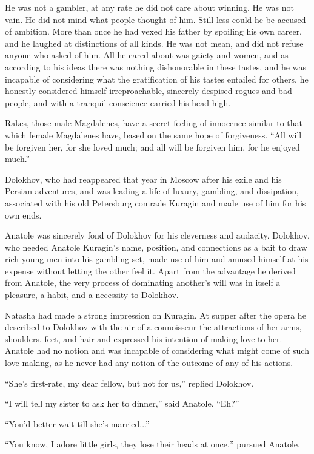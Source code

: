 He was not a gambler, at any rate he did not care about
winning. He was not vain. He did not mind what people thought of
him. Still less could he be accused of ambition. More than once
he had vexed his father by spoiling his own career, and he
laughed at distinctions of all kinds. He was not mean, and did
not refuse anyone who asked of him. All he cared about was gaiety
and women, and as according to his ideas there was nothing
dishonorable in these tastes, and he was incapable of considering
what the gratification of his tastes entailed for others, he
honestly considered himself irreproachable, sincerely despised
rogues and bad people, and with a tranquil conscience carried his
head high.

Rakes, those male Magdalenes, have a secret feeling of innocence
similar to that which female Magdalenes have, based on the same
hope of forgiveness. ``All will be forgiven her, for she loved
much; and all will be forgiven him, for he enjoyed much.''

Dolokhov, who had reappeared that year in Moscow after his exile
and his Persian adventures, and was leading a life of luxury,
gambling, and dissipation, associated with his old Petersburg
comrade Kuragin and made use of him for his own ends.

Anatole was sincerely fond of Dolokhov for his cleverness and
audacity.  Dolokhov, who needed Anatole Kuragin's name, position,
and connections as a bait to draw rich young men into his
gambling set, made use of him and amused himself at his expense
without letting the other feel it.  Apart from the advantage he
derived from Anatole, the very process of dominating another's
will was in itself a pleasure, a habit, and a necessity to
Dolokhov.

Natasha had made a strong impression on Kuragin. At supper after
the opera he described to Dolokhov with the air of a connoisseur
the attractions of her arms, shoulders, feet, and hair and
expressed his intention of making love to her. Anatole had no
notion and was incapable of considering what might come of such
love-making, as he never had any notion of the outcome of any of
his actions.

``She's first-rate, my dear fellow, but not for us,'' replied
Dolokhov.

``I will tell my sister to ask her to dinner,'' said
Anatole. ``Eh?''

``You'd better wait till she's married...''

``You know, I adore little girls, they lose their heads at
once,'' pursued Anatole.

